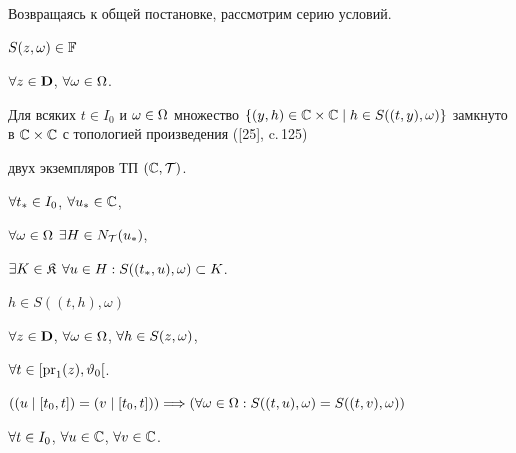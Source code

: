 Возвращаясь к общей постановке, рассмотрим серию условий.





\begin{conds}


$S(z,\omega) \in {\Bbb F}$


$\forall{z} \in {\bold D}$, $\forall{\omega} \in \Omega$.


\end{conds}





\begin{conds}


Для всяких $t \in {I_0}$ и $\omega \in \Om$ множество $\{(y,h) \in


{\Bbb C} \times {\Bbb C} \mid h \in S((t,y),\omega)\}$ замкнуто в ${\Bbb


C} \times {\Bbb C}$ с топологией произведения ([25], c.\,125)


двух экземпляров ТП $({\Bbb C},{\cal T})$.


\end{conds}





\begin{conds}


$\forall{t_*} \in {I_0}$, $\forall{u_*} \in {\Bbb C}$,


$\fo{\omega} \in \Om$ $\exi{H} \in


{N_{\cal T}}(u_*)$,


$\exi{K} \in {\frak K}$ $\fo{u} \in H:S(({t_*},u),\omega)


\subset K$.


\end{conds}





\begin{conds}


$h \in S((t,h),\omega)$


$\forall{z} \in {\bold D}$, $\forall{\omega} \in \Omega$, $\forall{h} \in S(z,\omega)$,


$\forall{t} \in[{\operatorname{pr}_1}(z),{{\vartheta}_0}[$.


\end{conds}





\begin{conds}


$((u \mid [{t_0},t]) = (v \mid [{t_0},t])) \Lo (\fo{\omega} \in \Om:


S((t,u),\omega) = S((t,v),\omega))$


$\forall{t} \in {I_0}$, $\forall{u} \in {\Bbb C}$, $\forall{v} \in {\Bbb C}$.


\end{conds}





